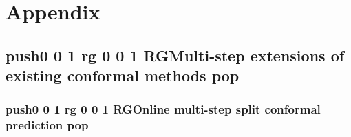 \documentclass[
  american,
  12pt]{article}
\theoremstyle{plain}
\theoremstyle{plain}
\theoremstyle{remark}
\newcommand{\CPTSadd}[1]{\ifmmode\else\leavevmode\fi\pdfcolorstack 0 push{0 0 1 rg 0 0 1 RG}#1\pdfcolorstack 0 pop}
\begin{document}
\renewcommand{\bibsection}{}


\endgroup

\newpage
\appendix
{}%

\setcounter{section}{0}
\setcounter{subsection}{0}
\setcounter{figure}{0}
\setcounter{table}{0}

\renewcommand{\thesection}{\Alph{section}}
\renewcommand{\thesubsection}{A\arabic{subsection}}
\renewcommand{\thefigure}{A\arabic{figure}}
\renewcommand{\thetable}{A\arabic{table}}

\section*{Appendix}\label{appendix}

\subsection{\CPTSadd{Multi-step extensions of existing conformal
methods}}\label{sec-extensions}

\subsubsection{\CPTSadd{Online multi-step split conformal
prediction}}\label{online-multi-step-split-conformal-prediction}
\end{document}
